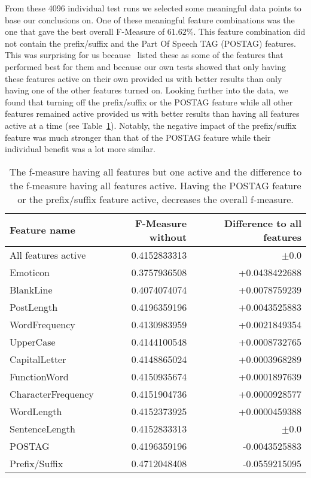 From these 4096 individual test runs we selected some meaningful data points to base our conclusions on.
One of these meaningful feature combinations was the one that gave the best overall F-Measure of $61.62\%$.
This feature combination did not contain the prefix/suffix and the Part Of Speech TAG (POSTAG) features.
This was surprising for us because~\cite{madigan2005author} listed these as some of the features that performed best for them and because our own tests showed that only having these features active on their own provided us with better results than only having one of the other features turned on.
Looking further into the data, we found that turning off the prefix/suffix or the POSTAG feature while all other features remained active provided us with better results than having all features active at a time (see Table~\ref{tab:feature_evaluation_1}).
Notably, the negative impact of the prefix/suffix feature was much stronger than that of the POSTAG feature while their individual benefit was a lot more similar.

\begin{table}[h]
	\begin{center}
    \begin{tabular}{l|r|r}
	Feature name		& F-Measure without & Difference to all features \\ \hline \hline
	All features active	& 0.4152833313 & $\pm$0.0 \\ \hline \hline
	Emoticon			& 0.3757936508 & +0.0438422688 \\ \hline
	BlankLine			& 0.4074074074 & +0.0078759239 \\ \hline
	PostLength			& 0.4196359196 & +0.0043525883 \\ \hline
	WordFrequency		& 0.4130983959 & +0.0021849354 \\ \hline
	UpperCase			& 0.4144100548 & +0.0008732765 \\ \hline
	CapitalLetter		& 0.4148865024 & +0.0003968289 \\ \hline
	FunctionWord		& 0.4150935674 & +0.0001897639 \\ \hline
	CharacterFrequency	& 0.4151904736 & +0.0000928577 \\ \hline
	WordLength			& 0.4152373925 & +0.0000459388 \\ \hline
	SentenceLength		& 0.4152833313 & $\pm$0.0 	   \\ \hline
	POSTAG				& 0.4196359196 & -0.0043525883 \\ \hline
	Prefix/Suffix		& 0.4712048408 & -0.0559215095 \\ \hline
    \end{tabular}
    \end{center}
	\caption{The f-measure having all features but one active and the difference to the f-measure having all features active. Having the POSTAG feature or the prefix/suffix feature active, decreases the overall f-measure.}
	\label{tab:feature_evaluation_1}
\end{table}

